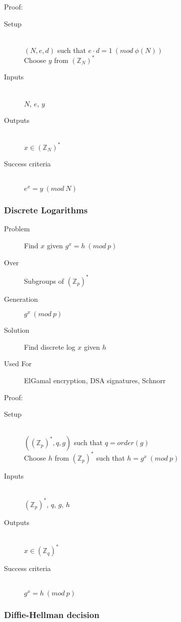 \documentclass[a4paper]{article}
\begin{document}
Proof:
\begin{description}
  \item[Setup] \hfill \\
    $(N, e, d)$ such that $e \cdot d = 1 \: (mod \: \phi(N))$ \\
    Choose $y$ from $(\mathbb{Z}_{N})^{*}$
  \item[Inputs] \hfill \\
    $N$, $e$, $y$
  \item[Outputs] \hfill \\
    $x \in (\mathbb{Z}_{N})^{*}$
  \item[Success criteria] \hfill \\
    $e^{x} = y \: (mod \: N)$
\end{description}

\subsubsection{Discrete Logarithms}

\begin{description}
  \item[Problem]
    Find $x$ given $g^{x} = h \: (mod \: p)$
  \item[Over]
    Subgroups of $(\mathbb{Z}_{p})^{*}$
  \item[Generation]
    $g^{x} \: (mod \: p)$
  \item[Solution]
    Find discrete log $x$ given $h$
  \item[Used For]
    ElGamal encryption, DSA signatures, Schnorr
\end{description}

Proof:
\begin{description}
  \item[Setup] \hfill \\
    $((\mathbb{Z}_{p})^{*}, q, g)$ such that $q = order(g)$ \\
    Choose $h$ from $(\mathbb{Z}_{p})^{*}$ such that $h = g^{x} \: (mod \: p)$
  \item[Inputs] \hfill \\
    $(\mathbb{Z}_{p})^{*}$, $q$, $g$, $h$
  \item[Outputs] \hfill \\
    $x \in (\mathbb{Z}_{q})^{*}$
  \item[Success criteria] \hfill \\
    $g^{x} = h \: (mod \: p)$
\end{description}

\subsubsection{Diffie-Hellman decision}
\end{document}
